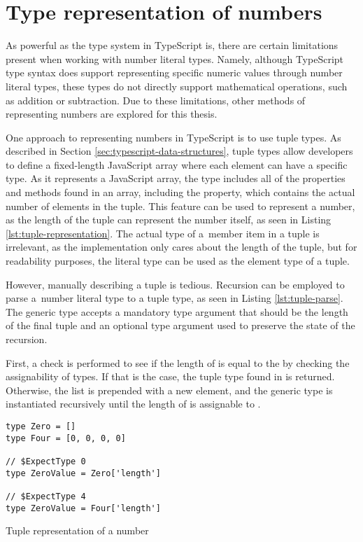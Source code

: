 \section{Type representation of numbers}

As powerful as the type system in TypeScript is, there are certain limitations present when working with number literal types. Namely, although TypeScript type syntax does support representing specific numeric values through number literal types, these types do not directly support mathematical operations, such as addition or subtraction. Due to these limitations, other methods of representing numbers are explored for this thesis.

One approach to representing numbers in TypeScript is to use tuple types. As described in Section \ref{sec:typescript-data-structures}, tuple types allow developers to define a fixed-length JavaScript array where each element can have a specific type. As it represents a JavaScript array, the type includes all of the properties and methods found in an array, including the  property, which contains the actual number of elements in the tuple. This feature can be used to represent a number, as the length of the tuple can represent the number itself, as seen in Listing \ref{lst:tuple-representation}. The actual type of a~member item in a tuple is irrelevant, as the implementation only cares about the length of the tuple, but for readability purposes, the literal type  can be used as the element type of a tuple.

However, manually describing a tuple is tedious. Recursion can be employed to parse a~number literal type to a tuple type, as seen in Listing \ref{lst:tuple-parse}. The  generic type accepts a mandatory type argument  that should be the length of the final tuple and an optional type argument  used to preserve the state of the recursion.

First, a check is performed to see if the length of  is equal to the  by checking the assignability of types. If that is the case, the tuple type found in  is returned. Otherwise, the list is prepended with a new  element, and the generic type is instantiated recursively until the length of  is assignable to .

\clearpage

\begin{listing}[ht]
  \begin{verbatim}
type Zero = []
type Four = [0, 0, 0, 0] 

// $ExpectType 0
type ZeroValue = Zero['length']

// $ExpectType 4
type ZeroValue = Four['length']
\end{verbatim}
  \caption{Tuple representation of a number}\label{lst:tuple-representation}
\end{listing}


